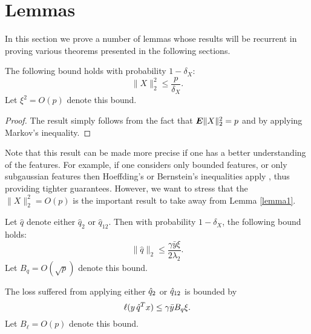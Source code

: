\documentclass{article}
\begin{document}
\section{Lemmas}
In this section we prove a number of lemmas whose results will be recurrent in proving
various theorems presented in the following sections.

\begin{lemma}
  \label{lemma1}
  The following bound holds with probability $1-\delta_X$:
  \[
    \|X\|_2^2 \leq \frac{p}{\delta_X}.
  \]
  Let $\xi^2 = O(p)$ denote this bound. 
\end{lemma}
\begin{proof}
  The result simply follows from the fact that $\bm E\|X\|^2_2 = p$ and by applying Markov's
  inequality. 
\end{proof}

\begin{rem}
  Note that this result can be made more precise if one has a better understanding of the
  features. For example, if one considers only bounded features, or only subgaussian
  features then Hoeffding's or Bernstein's inequalities apply , thus providing tighter guarantees. However, we want to stress that the
  $\|X\|^2_2 = O(p)$ is the important result to take away from Lemma \ref{lemma1}.
\end{rem}

\begin{lemma}
  \label{lemma2}
  Let $\hat q$ denote either $\hat q_{2}$ or $\hat q_{12}$. Then with probability
  $1-\delta_X$, the following bound holds:
  \[
    \|\hat q\|_2 \leq \frac{\gamma\bar y\xi}{2\lambda_2}.
  \]
  Let $B_{q} = O(\sqrt{p})$ denote this bound. 
\end{lemma}

\begin{coro}
  \label{coro1}
  The loss suffered from applying either $\hat q_2$ or $\hat q_{12}$ is bounded by
  \[
    \ell(y\,\hat q^Tx) \leq \gamma\bar y B_q \xi.
  \]
  Let $B_\ell = O(p)$ denote this bound.
\end{coro}
\end{document}
